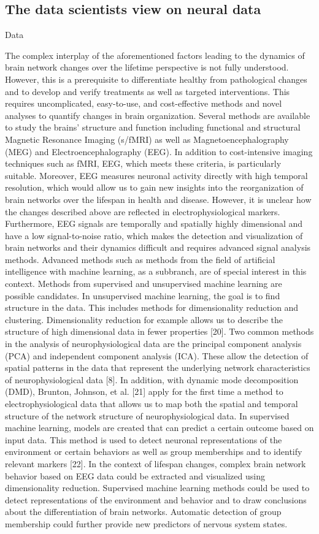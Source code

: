 \subsection{The data scientists view on neural data}
Data


The complex interplay of the aforementioned factors leading to the dynamics of brain network changes over the lifetime perspective is not fully understood. However, this is a prerequisite to differentiate healthy from pathological changes and to develop and verify treatments as well as targeted interventions. This requires uncomplicated, easy-to-use, and cost-effective methods and novel analyses to quantify changes in brain organization. Several methods are available to study the brains' structure and function including functional and structural Magnetic Resonance Imaging (s/fMRI) as well as Magnetoencephalography (MEG) and Electroencephalography (EEG). In addition to cost-intensive imaging techniques such as fMRI, EEG, which meets these criteria, is particularly suitable.
Moreover, EEG measures neuronal activity directly with high temporal resolution, which would allow us to gain new insights into the reorganization of brain networks over the lifespan in health and disease. However, it is unclear how the changes described above are reflected in electrophysiological markers. Furthermore, EEG signals are temporally and spatially highly dimensional and have a low signal-to-noise ratio, which makes the detection and visualization of brain networks and their dynamics difficult and requires advanced signal analysis methods. 
Advanced methods such as methods from the field of artificial intelligence with machine learning, as a subbranch, are of special interest in this context. Methods from supervised and unsupervised machine learning are possible candidates. In unsupervised machine learning, the goal is to find structure in the data. This includes methods for dimensionality reduction and clustering. Dimensionality reduction for example allows us to describe the structure of high dimensional data in fewer properties [20]. Two common methods in the analysis of neurophysiological data are the principal component analysis (PCA) and independent component analysis (ICA). These allow the detection of spatial patterns in the data that represent the underlying network characteristics of neurophysiological data [8]. In addition, with dynamic mode decomposition (DMD), Brunton, Johnson, et al. [21] apply for the first time a method to electrophysiological data that allows us to map both the spatial and temporal structure of the network structure of neurophysiological data.
In supervised machine learning, models are created that can predict a certain outcome based on input data. This method is used to detect neuronal representations of the environment or certain behaviors as well as group memberships and to identify relevant markers [22].
In the context of lifespan changes, complex brain network behavior based on EEG data could be extracted and visualized using dimensionality reduction. Supervised machine learning methods could be used to detect representations of the environment and behavior and to draw conclusions about the differentiation of brain networks. Automatic detection of group membership could further provide new predictors of nervous system states.
